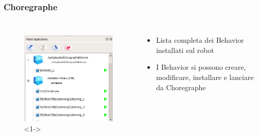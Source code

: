 \documentclass[aspectratio=169]{beamer}
\begin{document}
\begin{frame}
\frametitle{Choregraphe}
\begin{columns}
		\begin{figure}[ht]
		\begin{center}
		\includegraphics[width=.7\textwidth]{applications}<1->
		\end{center}
		\end{figure}
		\begin{itemize}
			\item<1-> Lista completa dei Behavior installati sul robot
			\item<2-> I Behavior si possono creare, modificare, installare e lanciare da Choregraphe
		\end{itemize}
\end{columns}
\end{frame}
\end{document}
